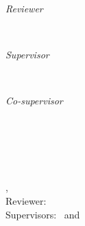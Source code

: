 \begin{titlepage}
	\vfill
	\begin{minipage}[t]{.27\textwidth}
		\raggedleft
		\textit{Reviewer}
	\end{minipage}
	\hspace*{15pt}
	\begin{minipage}[t]{.65\textwidth}
		{\large \thesisReviewer}
	\end{minipage} \\[10mm]
	\begin{minipage}[t]{.27\textwidth}
		\raggedleft
		\textit{Supervisor}
	\end{minipage}
	\hspace*{15pt}
	\begin{minipage}[t]{.65\textwidth}
		{\large \thesisFirstSupervisor} 
	\end{minipage} \\[5mm]
	\begin{minipage}[t]{.27\textwidth}
		\raggedleft
		\textit{Co-supervisor}
	\end{minipage}
	\hspace*{15pt}
	\begin{minipage}[t]{.65\textwidth}
		{\large \thesisSecondSupervisor}
	\end{minipage} \\[10mm]

	\thesisDate \\

\end{titlepage}


\hfill
\vfill
{
	\small
	\textbf{\thesisName} \\
	\textit{\thesisTitle} \\
	\thesisSubject, \thesisDate \\
	Reviewer: \thesisReviewer\  \\
	Supervisors: \thesisFirstSupervisor\ and \thesisSecondSupervisor \\[1.5em]
	\textbf{\thesisUniversity} \\
	\thesisUniversityInstitute \\
	\thesisUniversityDepartment \\
	\thesisUniversityStreetAddress
}

